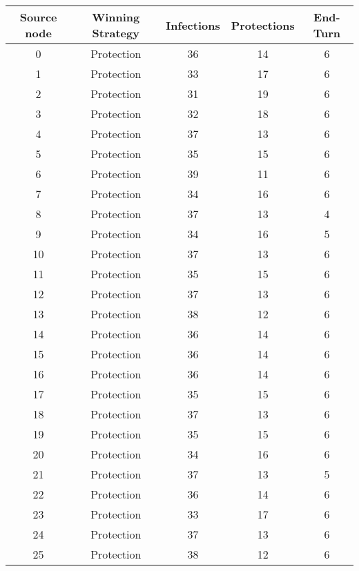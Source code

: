 \documentclass[results.tex]{subfiles}
\begin{document}
\begin{center}
  \begin{tabular}{| c || c | c | c | c |}
    \hline
    {\bfseries Source node} & {\bfseries Winning Strategy} & {\bfseries Infections} & {\bfseries Protections} & {\bfseries End-Turn} \\  %
    \hline\hline
    0 & Protection & 36 & 14 & 6 \\ 
    \hline
    1 & Protection & 33 & 17 & 6 \\ 
    \hline
    2 & Protection & 31 & 19 & 6 \\ 
    \hline
    3 & Protection & 32 & 18 & 6 \\ 
    \hline
    4 & Protection & 37 & 13 & 6 \\ 
    \hline
    5 & Protection & 35 & 15 & 6 \\ 
    \hline
    6 & Protection & 39 & 11 & 6 \\ 
    \hline
    7 & Protection & 34 & 16 & 6 \\ 
    \hline
    8 & Protection & 37 & 13 & 4 \\ 
    \hline
    9 & Protection & 34 & 16 & 5 \\ 
    \hline
    10 & Protection & 37 & 13 & 6 \\ 
    \hline
    11 & Protection & 35 & 15 & 6 \\ 
    \hline
    12 & Protection & 37 & 13 & 6 \\ 
    \hline
    13 & Protection & 38 & 12 & 6 \\ 
    \hline
    14 & Protection & 36 & 14 & 6 \\ 
    \hline
    15 & Protection & 36 & 14 & 6 \\ 
    \hline
    16 & Protection & 36 & 14 & 6 \\ 
    \hline
    17 & Protection & 35 & 15 & 6 \\ 
    \hline
    18 & Protection & 37 & 13 & 6 \\ 
    \hline
    19 & Protection & 35 & 15 & 6 \\ 
    \hline
    20 & Protection & 34 & 16 & 6 \\ 
    \hline
    21 & Protection & 37 & 13 & 5 \\ 
    \hline
    22 & Protection & 36 & 14 & 6 \\ 
    \hline
    23 & Protection & 33 & 17 & 6 \\ 
    \hline
    24 & Protection & 37 & 13 & 6 \\ 
    \hline
    25 & Protection & 38 & 12 & 6 \\ 

\end{tabular}
\end{center}
\end{document}

